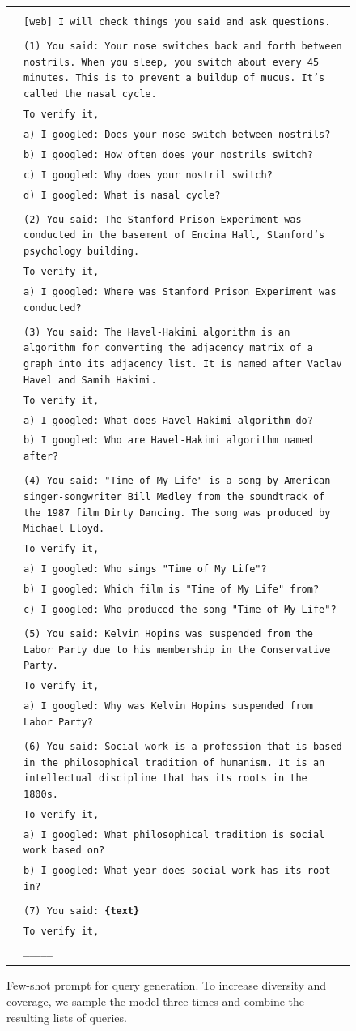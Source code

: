 { %

\newcommand{\pWidth}{5.8in}
\newcommand{\pStart}{\setcounter{pCount}{1}}
\newcommand{\pRow}[1]{\texttt{\tiny\color{gray}\arabic{pCount}}&\texttt{#1}\stepcounter{pCount}\\}
\newcommand{\pVar}[1]{\textbf{\{#1\}}}
\newcommand{\pBlank}{\_\_\_\_\_}

\begin{figure}[p]
\begin{center}\scriptsize
\begin{tabular}{|rp{\pWidth}|}\hline\pStart&\\
\pRow{[web] I will check things you said and ask questions.}
\pRow{}
\pRow{(1) You said: Your nose switches back and forth between nostrils. When you sleep, you switch about every 45 minutes.  This is to prevent a buildup of mucus. It's called the nasal cycle.}
\pRow{To verify it,}
\pRow{a) I googled: Does your nose switch between nostrils?}
\pRow{b) I googled: How often does your nostrils switch?}
\pRow{c) I googled: Why does your nostril switch?}
\pRow{d) I googled: What is nasal cycle?}
\pRow{}
\pRow{(2) You said: The Stanford Prison Experiment was conducted in the basement of Encina Hall, Stanford's psychology building.}
\pRow{To verify it,}
\pRow{a) I googled: Where was Stanford Prison Experiment was conducted?}
\pRow{}
\pRow{(3) You said: The Havel-Hakimi algorithm is an algorithm for converting the adjacency matrix of a graph into its adjacency list. It is named after Vaclav Havel and Samih Hakimi.}
\pRow{To verify it,}
\pRow{a) I googled: What does Havel-Hakimi algorithm do?}
\pRow{b) I googled: Who are Havel-Hakimi algorithm named after?}
\pRow{}
\pRow{(4) You said: "Time of My Life" is a song by American singer-songwriter Bill Medley from the soundtrack of the 1987 film Dirty Dancing. The song was produced by Michael Lloyd.}
\pRow{To verify it,}
\pRow{a) I googled: Who sings "Time of My Life"?}
\pRow{b) I googled: Which film is "Time of My Life" from?}
\pRow{c) I googled: Who produced the song "Time of My Life"?}
\pRow{}
\pRow{(5) You said: Kelvin Hopins was suspended from the Labor Party due to his membership in the Conservative Party.}
\pRow{To verify it,}
\pRow{a) I googled: Why was Kelvin Hopins suspended from Labor Party?}
\pRow{}
\pRow{(6) You said: Social work is a profession that is based in the philosophical tradition of humanism. It is an intellectual discipline that has its roots in the 1800s.}
\pRow{To verify it,}
\pRow{a) I googled: What philosophical tradition is social work based on?}
\pRow{b) I googled: What year does social work has its root in?}
\pRow{}
\pRow{(7) You said: \pVar{text}}
\pRow{To verify it,}
\pRow{\pBlank}
&\\\hline\end{tabular}
\caption{Few-shot prompt for query generation. To increase diversity and coverage, we sample the model three times and combine the resulting lists of queries.}
\label{fig:prompt_cqgen}
\end{center}
\end{figure}

}
